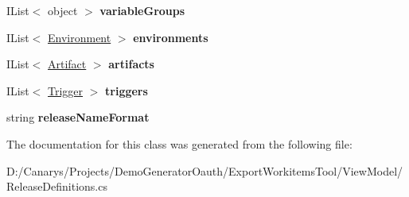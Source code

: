 \begin{DoxyCompactItemize}
\item 
\mbox{\label{class_templates_generator_tool_1_1_view_model_1_1_release_definitions_1_1_release_definition_aacf55c822c64017831011a8f52a3176f}} 
I\+List$<$ object $>$ {\bfseries variable\+Groups}
\item 
\mbox{\label{class_templates_generator_tool_1_1_view_model_1_1_release_definitions_1_1_release_definition_ad4354e002f7864357c6ab1c4ec0ac821}} 
I\+List$<$ \mbox{\hyperlink{class_templates_generator_tool_1_1_view_model_1_1_release_definitions_1_1_environment}{Environment}} $>$ {\bfseries environments}
\item 
\mbox{\label{class_templates_generator_tool_1_1_view_model_1_1_release_definitions_1_1_release_definition_a914cd813bcc8a528496183d05f199580}} 
I\+List$<$ \mbox{\hyperlink{class_templates_generator_tool_1_1_view_model_1_1_release_definitions_1_1_artifact}{Artifact}} $>$ {\bfseries artifacts}
\item 
\mbox{\label{class_templates_generator_tool_1_1_view_model_1_1_release_definitions_1_1_release_definition_ab9694bcf5561e170f772e804e6dcf6c4}} 
I\+List$<$ \mbox{\hyperlink{class_templates_generator_tool_1_1_view_model_1_1_release_definitions_1_1_trigger}{Trigger}} $>$ {\bfseries triggers}
\item 
\mbox{\label{class_templates_generator_tool_1_1_view_model_1_1_release_definitions_1_1_release_definition_a4425a95f8e63f8fe439f219d4a8ae3cc}} 
string {\bfseries release\+Name\+Format}
\end{DoxyCompactItemize}


The documentation for this class was generated from the following file\+:\begin{DoxyCompactItemize}
\item 
D\+:/\+Canarys/\+Projects/\+Demo\+Generator\+Oauth/\+Export\+Workitems\+Tool/\+View\+Model/Release\+Definitions.\+cs\end{DoxyCompactItemize}
